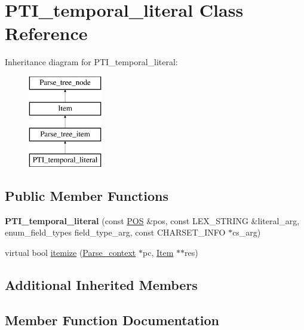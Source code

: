 \hypertarget{classPTI__temporal__literal}{}\section{P\+T\+I\+\_\+temporal\+\_\+literal Class Reference}
\label{classPTI__temporal__literal}
Inheritance diagram for P\+T\+I\+\_\+temporal\+\_\+literal\+:\begin{figure}[H]
\begin{center}
\leavevmode
\includegraphics[height=4.000000cm]{classPTI__temporal__literal}
\end{center}
\end{figure}
\subsection*{Public Member Functions}
\begin{DoxyCompactItemize}
\item 
\mbox{\label{classPTI__temporal__literal_af2e9e9933053ccdc5026931ab8702a9a}} 
{\bfseries P\+T\+I\+\_\+temporal\+\_\+literal} (const \mbox{\hyperlink{structYYLTYPE}{P\+OS}} \&pos, const L\+E\+X\+\_\+\+S\+T\+R\+I\+NG \&literal\+\_\+arg, enum\+\_\+field\+\_\+types field\+\_\+type\+\_\+arg, const C\+H\+A\+R\+S\+E\+T\+\_\+\+I\+N\+FO $\ast$cs\+\_\+arg)
\item 
virtual bool \mbox{\hyperlink{classPTI__temporal__literal_a6fd5bf8c4635fe88d86317c1e14b0d90}{itemize}} (\mbox{\hyperlink{structParse__context}{Parse\+\_\+context}} $\ast$pc, \mbox{\hyperlink{classItem}{Item}} $\ast$$\ast$res)
\end{DoxyCompactItemize}
\subsection*{Additional Inherited Members}


\subsection{Member Function Documentation}
\mbox{\label{classPTI__temporal__literal_a6fd5bf8c4635fe88d86317c1e14b0d90}} 

